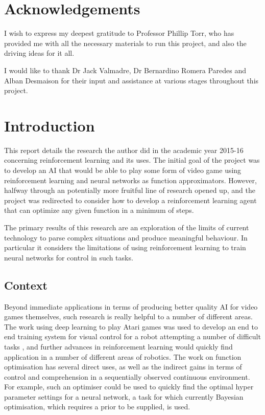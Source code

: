 \section{Acknowledgements}
I wish to express my deepest gratitude to Professor Phillip Torr, who has provided me with all the necessary materials to run this project, and also the driving ideas for it all.

I would like to thank Dr Jack Valmadre, Dr Bernardino Romera Paredes and Alban Desmaison
for their input and assistance at various stages throughout this project.
\section{Introduction}
This report details the research the author did in the academic year 2015-16 concerning reinforcement learning and its uses. The initial goal of the project was to develop an AI that would be able to play some form of video game using reinforcement learning and neural networks as function approximators. However, halfway through an potentially more fruitful line of research opened up, and the project was redirected to consider how to develop a reinforcement learning agent that can optimize any given function in a minimum of steps.

The primary results of this research are an exploration of the limits of current technology to parse complex situations and produce meaningful behaviour. In particular it considers the limitations of using reinforcement learning to train neural networks for control in such tasks.

\subsection{Context}
Beyond immediate applications in terms of producing better quality AI for video games themselves, such research is really helpful to a number of different areas. The work using deep learning to play Atari games \cite{atariDQN} was used to develop an end to end training system for visual control for a robot attempting a number of difficult tasks \cite{levine2015end}, and further advances in reinforcement learning would quickly find application in a number of different areas of robotics. The work on function optimisation has several direct uses, as well as the indirect gains in terms of control and comprehension in a sequentially observed continuous environment. For example, such an optimiser could be used to quickly find the optimal hyper parameter settings for  a neural network, a task for which currently Bayesian optimisation, which requires a prior to be supplied, is used.

